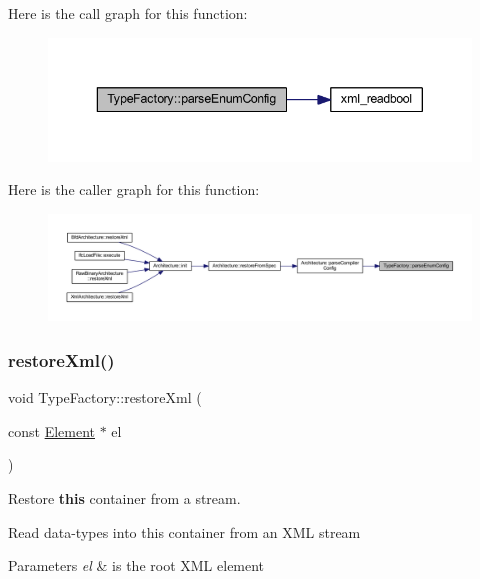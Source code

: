Here is the call graph for this function\+:
\nopagebreak
\begin{figure}[H]
\begin{center}
\leavevmode
\includegraphics[width=343pt]{class_type_factory_a8d10b37cae4c213ca3a613f454ada676_cgraph}
\end{center}
\end{figure}
Here is the caller graph for this function\+:
\nopagebreak
\begin{figure}[H]
\begin{center}
\leavevmode
\includegraphics[width=350pt]{class_type_factory_a8d10b37cae4c213ca3a613f454ada676_icgraph}
\end{center}
\end{figure}
\mbox{\label{class_type_factory_af9a16d80bfd84732a8dca11ed4a23fab}} 
\subsubsection{\texorpdfstring{restoreXml()}{restoreXml()}}
{\footnotesize\ttfamily void Type\+Factory\+::restore\+Xml (\begin{DoxyParamCaption}\item[{const \mbox{\hyperlink{class_element}{Element}} $\ast$}]{el }\end{DoxyParamCaption})}



Restore {\bfseries{this}} container from a stream. 

Read data-\/types into this container from an X\+ML stream 
\begin{DoxyParams}{Parameters}
{\em el} & is the root X\+ML element \\
\hline
\end{DoxyParams}


